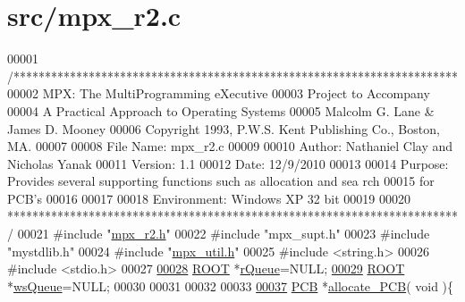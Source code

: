\hypertarget{mpx__r2_8c_source}{
\section{src/mpx\_\-r2.c}
}

\begin{DoxyCode}
00001 \textcolor{comment}{/***********************************************************************}
00002 \textcolor{comment}{        MPX: The MultiProgramming eXecutive}
00003 \textcolor{comment}{        Project to Accompany}
00004 \textcolor{comment}{        A Practical Approach to Operating Systems}
00005 \textcolor{comment}{        Malcolm G. Lane & James D. Mooney}
00006 \textcolor{comment}{        Copyright 1993, P.W.S. Kent Publishing Co., Boston, MA.}
00007 \textcolor{comment}{}
00008 \textcolor{comment}{        File Name:      mpx\_r2.c}
00009 \textcolor{comment}{}
00010 \textcolor{comment}{        Author: Nathaniel Clay and Nicholas Yanak}
00011 \textcolor{comment}{        Version: 1.1}
00012 \textcolor{comment}{        Date:  12/9/2010}
00013 \textcolor{comment}{}
00014 \textcolor{comment}{        Purpose: Provides several supporting functions such as allocation and sea
      rch}
00015 \textcolor{comment}{        for PCB's}
00016 \textcolor{comment}{}
00017 \textcolor{comment}{                }
00018 \textcolor{comment}{        Environment: Windows XP 32 bit}
00019 \textcolor{comment}{}
00020 \textcolor{comment}{************************************************************************/}
00021 \textcolor{preprocessor}{#include "\hyperlink{mpx__r2_8h}{mpx_r2.h}"}
00022 \textcolor{preprocessor}{#include "mpx\_supt.h"}
00023 \textcolor{preprocessor}{#include "mystdlib.h"}
00024 \textcolor{preprocessor}{#include "\hyperlink{mpx__util_8h}{mpx_util.h}"}
00025 \textcolor{preprocessor}{#include <string.h>}
00026 \textcolor{preprocessor}{#include <stdio.h>}
00027 
\hypertarget{mpx__r2_8c_source_l00028}{}\hyperlink{mpx__r4_8c_8_r_e_m_o_t_e_8c_afe54c168944e64a28d76b6e4d3abb391}{00028} \hyperlink{structroot}{ROOT} *\hyperlink{mpx__r2_8c_afe54c168944e64a28d76b6e4d3abb391}{rQueue}=NULL; 
\hypertarget{mpx__r2_8c_source_l00029}{}\hyperlink{mpx__r4_8c_8_r_e_m_o_t_e_8c_a8dec03d44c5fad121b5568399d1cf278}{00029} \hyperlink{structroot}{ROOT} *\hyperlink{mpx__r2_8c_ac4950750e25f86d7ee69d6bcca87ef5f}{wsQueue}=NULL;
00030 
00031 
00032 
00033 
\hypertarget{mpx__r2_8c_source_l00037}{}\hyperlink{mpx__r2_8h_a58a8a1ea0a96b9ecf0be29179a5a0a1e}{00037} \hyperlink{structprocess}{PCB} *\hyperlink{mpx__r2_8c_a58a8a1ea0a96b9ecf0be29179a5a0a1e}{allocate_PCB}( \textcolor{keywordtype}{void} )\{

\end{DoxyCode}
